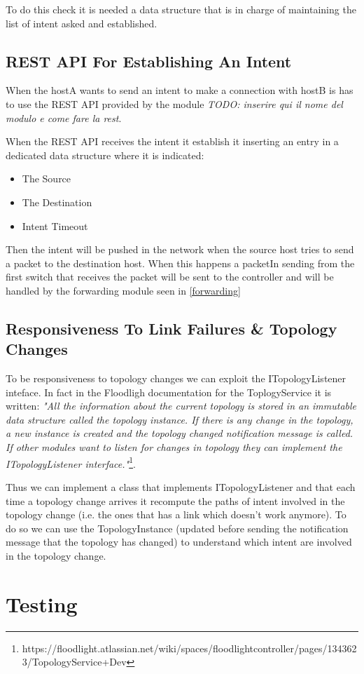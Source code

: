 \documentclass[a4paper]{report}
\begin{document}
	\noindent To do this check it is needed a data structure that is in charge of maintaining the list of intent asked and established.
	
	\section{REST API For Establishing An Intent}
	\noindent When the hostA wants to send an intent to make a connection with hostB is has to use the REST API provided by the module \textit{TODO: inserire qui il nome del modulo e come fare la rest}.
	
	\noindent When the REST API receives the intent it establish it inserting an entry in a dedicated data structure where it is indicated:
	\begin{itemize}
	\item The Source
	\item The Destination
	\item Intent Timeout
	\end{itemize}
	
	\noindent Then the intent will be pushed in the network when the source host tries to send a packet to the destination host. When this happens a packetIn sending from the first switch that receives the packet will be sent to the controller and will be handled by the forwarding module seen in \ref{forwarding}
	
	\section{Responsiveness To Link Failures \& Topology Changes}
	To be responsiveness to topology changes we can exploit the ITopologyListener inteface. In fact in the Floodligh documentation for the ToplogyService it is written: \textit{"All the information about the current topology is stored in an immutable data structure called the topology instance. If there is any change in the topology, a new instance is created and the topology changed notification message is called. If other modules want to listen for changes in topology they can implement the ITopologyListener interface."}\footnote{https://floodlight.atlassian.net/wiki/spaces/floodlightcontroller/pages/1343623/TopologyService+Dev}.
	
	\noindent Thus we can implement a class that implements ITopologyListener and that each time a topology change arrives it recompute the paths of intent involved in the topology change (i.e. the ones that has a link which doesn't work anymore). To do so we can use the TopologyInstance (updated before sending the notification message that the topology has changed) to understand which intent are involved in the topology change.
	
	\chapter{Testing}
	
\end{document}
